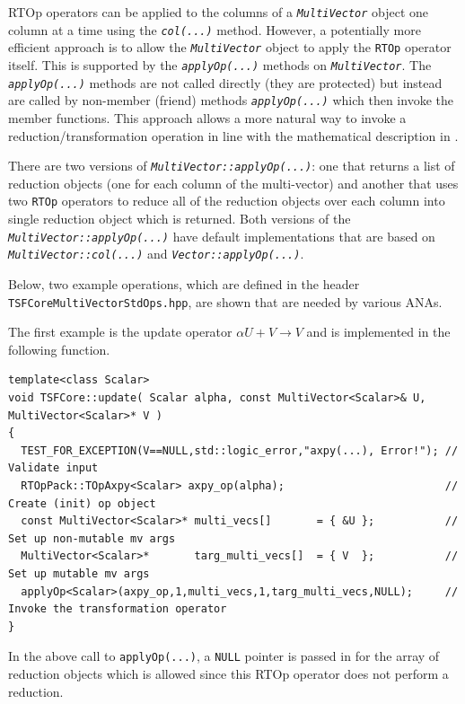 RTOp operators can be applied to the columns of a
{}\texttt{\textit{Multi\-Vector}} object one column at a time using
the {}\texttt{\textit{col(...)}} method.  However, a potentially more
efficient approach is to allow the {}\texttt{\textit{Multi\-Vector}}
object to apply the {}\texttt{RTOp} operator itself.  This is
supported by the {}\texttt{\textit{applyOp(\-...)}} methods on
{}\texttt{\textit{Multi\-Vector}}.  The
{}\texttt{\textit{applyOp(\-...)}} methods are not called directly
(they are protected) but instead are called by non-member (friend)
methods {}\texttt{\textit{applyOp(\-...)}} which then invoke the
member functions.  This approach allows a more natural way to invoke a
reduction/transformation operation in line with the mathematical
description in {}\cite{ref:rtop_toms}.

There are two versions of
{}\texttt{\textit{Multi\-Vector\-::applyOp(\-...)}}: one that returns
a list of reduction objects (one for each column of the multi-vector)
and another that uses two {}\texttt{RTOp} operators to reduce all of
the reduction objects over each column into single reduction object
which is returned.  Both versions of the
{}\texttt{\textit{Multi\-Vector\-::applyOp(\-...)}} have default
implementations that are based on
{}\texttt{\textit{Multi\-Vector\-::col(...)}} and
{}\texttt{\textit{Vector\-::applyOp(\-...)}}.

Below, two example operations, which are defined in the header
{}\texttt{TSFCore\-Multi\-Vector\-Std\-Ops.hpp}, are shown that are
needed by various ANAs.

The first example is the update operator $\alpha U + V \rightarrow V$
and is implemented in the following function.

{\scriptsize\begin{verbatim}
template<class Scalar>
void TSFCore::update( Scalar alpha, const MultiVector<Scalar>& U, MultiVector<Scalar>* V )
{
  TEST_FOR_EXCEPTION(V==NULL,std::logic_error,"axpy(...), Error!"); // Validate input
  RTOpPack::TOpAxpy<Scalar> axpy_op(alpha);                         // Create (init) op object
  const MultiVector<Scalar>* multi_vecs[]       = { &U };           // Set up non-mutable mv args
  MultiVector<Scalar>*       targ_multi_vecs[]  = { V  };           // Set up mutable mv args
  applyOp<Scalar>(axpy_op,1,multi_vecs,1,targ_multi_vecs,NULL);     // Invoke the transformation operator
}
\end{verbatim}}

{}\noindent{}In the above call to {}\texttt{applyOp(\-...)}, a
{}\texttt{NULL} pointer is passed in for the array of reduction
objects which is allowed since this RTOp operator does not perform a
reduction.

